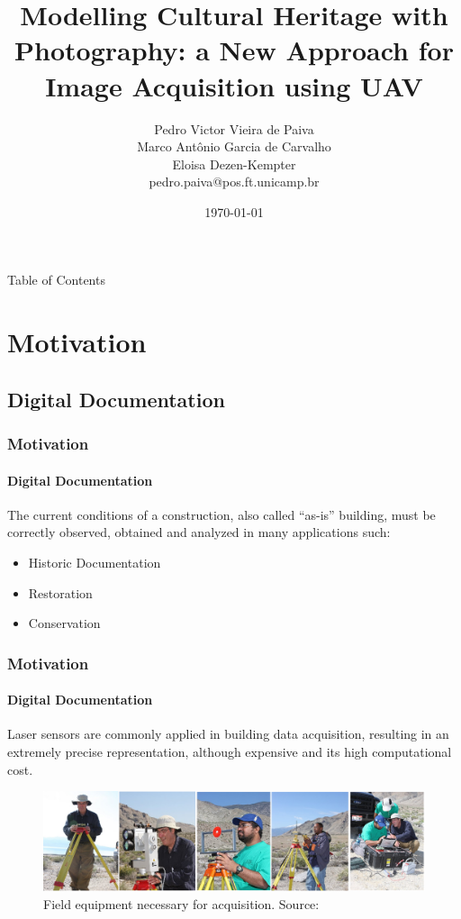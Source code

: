 \documentclass{beamer}
\title[Modelling Cultural Heritage with Photography]{
 Modelling Cultural Heritage with Photography: a New Approach for Image Acquisition using UAV}
\author[Pedro Victor Vieira de Paiva]{
  Pedro Victor Vieira de Paiva\\
  Marco Antônio Garcia de Carvalho\\
  Eloisa Dezen-Kempter\\\medskip
  {\small {pedro.paiva@pos.ft.unicamp.br}
  }}
\institute[Universidade Estadual de Campinas ]{
  Laboratório de Computação Visual -- IMAGELab \\
  }
\date{\today}
\begin{document}
\begin{frame}
  \titlepage
\end{frame}

\begin{frame}{Table of Contents}
    \begin{multicols}{2}
    \tableofcontents
    \end{multicols}
\end{frame}

\section{Motivation}
\subsection{Digital Documentation}
\begin{frame}
    \frametitle{Motivation}
    \framesubtitle{Digital Documentation}
    \justifying The current conditions of a construction, also called “as-is” building, must be correctly observed, obtained and analyzed in many applications \citep{remondino2011} such: 
    
    \begin{itemize}[<+-| alert@+>]
        \item Historic Documentation
        \item Restoration
        \item Conservation
    \end{itemize}
\end{frame}

\begin{frame}
    \frametitle{Motivation}
    \framesubtitle{Digital Documentation}
    \justifying Laser sensors are commonly applied in building data acquisition, resulting in an extremely precise representation, although expensive and its high computational cost.
    
    \begin{figure}
        \centering
        \includegraphics[scale=.16]{images/6}
        \caption{Field equipment necessary for acquisition. Source: \citep{oldow2008application}}
    \end{figure}
    
\end{frame}
\end{document}
